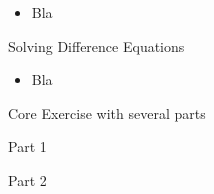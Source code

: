 \begin{lesson}

	\begin{itemize}
		\item Bla
	\end{itemize}
	

\end{lesson}


%
%
%
%
%
%
%
%











%
%



\begin{module}{Solving Difference Equations}
	\label{diff:solve}

	
	
\end{module}



\begin{lesson}

	\begin{itemize}
		\item Bla
	\end{itemize}
	

\end{lesson}


\newpage

\question
	Core Exercise with several parts
\begin{parts}
	\item Part 1
	\item Part 2
\end{parts}

\bookonlynewpage


